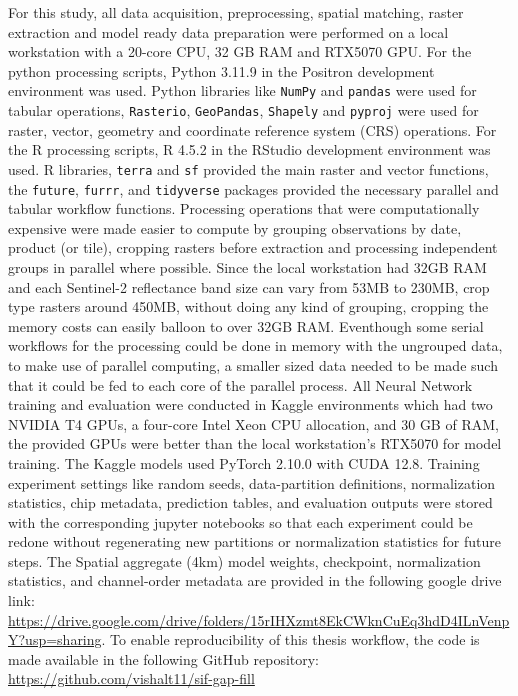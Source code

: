 For this study, all data acquisition, preprocessing, spatial matching, raster extraction and model ready data preparation were performed on a local workstation with a 20-core CPU, 32 GB RAM and RTX5070 GPU. For the python processing scripts, Python 3.11.9 in the Positron development environment was used. Python libraries like \texttt{NumPy} and \texttt{pandas} were used for tabular operations, \texttt{Rasterio}, \texttt{GeoPandas}, \texttt{Shapely} and \texttt{pyproj} were used for raster, vector, geometry and coordinate reference system (CRS) operations. For the R processing scripts, R 4.5.2 in the RStudio development environment was used. R libraries, \texttt{terra} and \texttt{sf} provided the main raster and vector functions, the \texttt{future}, \texttt{furrr}, and \texttt{tidyverse} packages provided the necessary parallel and tabular workflow functions. Processing operations that were computationally expensive were made easier to compute by grouping observations by date, product (or tile), cropping rasters before extraction and processing independent groups in parallel where possible. Since the local workstation had 32GB RAM and each Sentinel-2 reflectance band size can vary from 53MB to 230MB, crop type rasters around 450MB, without doing any kind of grouping, cropping the memory costs can easily balloon to over 32GB RAM. Eventhough some serial workflows for the processing could be done in memory with the ungrouped data, to make use of parallel computing, a smaller sized data needed to be made such that it could be fed to each core of the parallel process. All Neural Network training and evaluation were conducted in Kaggle environments which had two NVIDIA T4 GPUs, a four-core Intel Xeon CPU allocation, and 30 GB of RAM, the provided GPUs were better than the local workstation's RTX5070 for model training. The Kaggle models used PyTorch 2.10.0 with CUDA 12.8. Training experiment settings like random seeds, data-partition definitions, normalization statistics, chip metadata, prediction tables, and evaluation outputs were stored with the corresponding jupyter notebooks so that each experiment could be redone without regenerating new partitions or normalization statistics for future steps. The Spatial aggregate (4km) model weights, checkpoint, normalization statistics, and channel-order metadata are provided in the following google drive link: \url{https://drive.google.com/drive/folders/15rIHXzmt8EkCWknCuEq3hdD4ILnVenpY?usp=sharing}. To enable reproducibility of this thesis workflow, the code is made available in the following GitHub repository: \url{https://github.com/vishalt11/sif-gap-fill}


